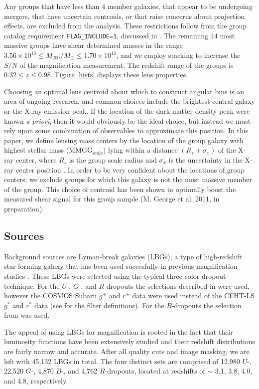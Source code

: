 Any groups that have less than 4 member galaxies, that appear to be undergoing mergers, that have uncertain centroids, or that raise concerns about projection effects, are excluded from the analysis. These restrictions follow from the group catalog requirement \texttt{FLAG\_INCLUDE=1}, discussed in \citet{George11}. The remaining $44$ most massive groups have shear determined masses in the range $ 3.56 \times 10^{13} \le M_{200} / M_\odot \le 1.70 \times 10^{14} $, and we employ stacking to increase the $S/N$ of the magnification measurement.  The redshift range of the groups is $ 0.32 \le z \le 0.98 $. Figure \ref{hists} displays these lens properties.

Choosing an optimal lens centroid about which to construct angular bins is an area of ongoing research, and common choices include the brightest central galaxy or the X-ray emission peak.  If the location of the dark matter density peak were known {\it a priori}, then it would obviously be the ideal choice, but instead we must rely upon some combination of observables to approximate this position.  In this paper, we define lensing mass centers by the location of the group galaxy with highest stellar mass (MMGG$_\mathrm{scale}$) lying within a distance $ (R_s + \sigma_x) $ of the X-ray center, where $ R_s $ is the group scale radius and $ \sigma_x $ is the uncertainty in the X-ray center position \citep{George11}.  In order to be very confident about the locations of group centers, we exclude groups for which this galaxy is not the most massive member of the group.  This choice of centroid has been shown to optimally boost the measured shear signal for this group sample (M. George et al. 2011, in preparation).  

\subsection{Sources}
Background sources are Lyman-break galaxies (LBGs), a type of high-redshift star-forming galaxy that has been used succesfully in previous magnification studies \citep[see][]{Hildebrandt09b, Hildebrandt11}. These LBGs were selected using the typical three color dropout technique. For the $U$-, $G$-, and $R$-dropouts the selections described in \citet{Hildebrandt09a} were used, however the COSMOS Subaru $g^+$ and $r^+$ data were used instead of the CFHT-LS $g^*$ and $r^*$ data (see \citet{Capak07} for the filter definitions). For the $B$-dropouts the selection from \citet{Ouchi04} was used.  

The appeal of using LBGs for magnification is rooted in the fact that their luminosity functions have been extensively studied and their redshift distributions are fairly narrow and accurate.  After all quality cuts and image masking, we are left with 45,132 LBGs in total.  The four distinct sets are comprised of 12,980 $U$-, 22,520 $G$-, 4,870 $B$-, and 4,762 $R$-dropouts, located at redshifts of $\sim$ 3.1, 3.8, 4.0, and 4.8, respectively.

